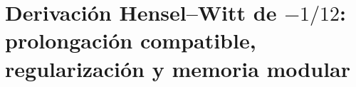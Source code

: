 \chapter{Derivación Hensel--Witt de \(-1/12\): prolongación compatible, regularización y memoria modular}
\label{chap:p3-final:33:menos_un_doceavo}

